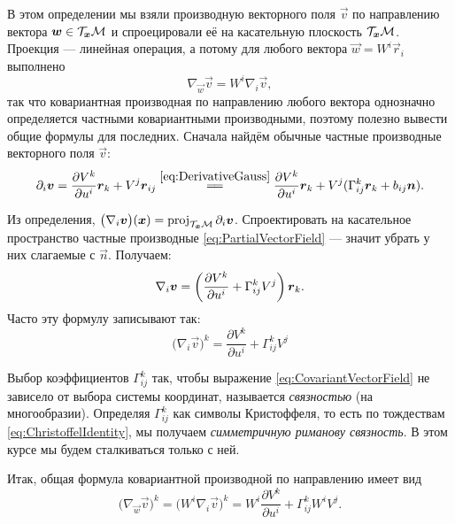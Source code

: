В этом определении мы взяли производную векторного поля $\vec{v}$ по направлению вектора $\boldsymbol{w} \in \mathcal{T}_{\boldsymbol{x}}\mathcal{M}$ и спроецировали её на касательную плоскость $\mathcal{T}_{\boldsymbol{x}}\mathcal{M}$. Проекция --- линейная операция, а потому для любого вектора $\vec{w} = W^i\vec{r}_i$ выполнено
\[
	\nabla_{\vec{w}}\vec{v} = W^i\nabla_i\vec{v},
\]
так что ковариантная производная по направлению любого вектора однозначно определяется частными ковариантными производными, поэтому полезно вывести общие формулы для последних. Сначала найдём обычные частные производные векторного поля $\vec{v}$:
\begin{equation} \label{eq:PartialVectorField}
	\partial_i\vec{v} = \frac{\partial V^k}{\partial u^i}\vec{r}_k + V^j\vec{r}_{ij} \stackrel{\eqref{eq:DerivativeGauss}}{=\joinrel=} \frac{\partial V^k}{\partial u^i}\vec{r}_k + V^j(\Gamma_{ij}^k\vec{r}_k + b_{ij}\vec{n}).
\end{equation}

Из определения, $\big(\nabla_i\boldsymbol{v}\big)(\boldsymbol{x}) = \operatorname{proj}_{\mathcal{T}_{\boldsymbol{x}}\mathcal{M}}\partial_i\boldsymbol{v}$. Спроектировать на касательное пространство частные производные \eqref{eq:PartialVectorField} --- значит убрать у них слагаемые с $\vec{n}$. Получаем:
\[
	\nabla_i\boldsymbol{v} = \left(\frac{\partial V^k}{\partial u^i} + \Gamma_{ij}^kV^j\right)\boldsymbol{r}_k.
\]
Часто эту формулу записывают так:
\begin{equation} \label{eq:CovariantVectorField}
	\big(\nabla_i\vec{v}\big)^k = \frac{\partial V^k}{\partial u^i} + \Gamma_{ij}^kV^j
\end{equation}

Выбор коэффициентов $\Gamma_{ij}^k$ так, чтобы выражение \eqref{eq:CovariantVectorField} не зависело от выбора системы координат, называется \textit{связностью} (на многообразии). Определяя $\Gamma_{ij}^k$ как символы Кристоффеля, то есть по тождествам \eqref{eq:ChristoffelIdentity}, мы получаем \textit{симметричную риманову связность}. В этом курсе мы будем сталкиваться только с ней.

Итак, общая формула ковариантной производной по направлению имеет вид
\begin{equation} \label{eq:CovariantFormula}
	\big(\nabla_{\vec{w}}\vec{v}\big)^k = \big(W^i\nabla_i\vec{v}\big)^k = W^i\frac{\partial V^k}{\partial u^i} + \Gamma_{ij}^kW^iV^j.
\end{equation}


